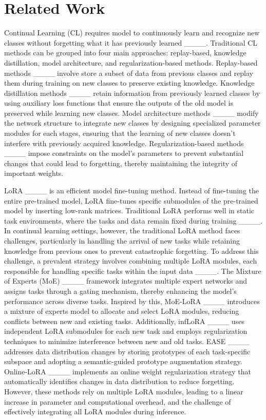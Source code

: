 \section{Related Work}

Continual Learning (CL) requires model to continuously learn and recognize new classes without forgetting what it has previously learned ____. Traditional CL methods can be grouped into four main approaches: replay-based, knowledge distillation, model architecture, and regularization-based methods. Replay-based methods ____ involve store a subset of data from previous classes and replay them during training on new classes to preserve existing knowledge. Knowledge distillation methods ____ retain information from previously learned classes by using auxiliary loss functions that ensure the outputs of the old model is preserved while learning new classes. Model architecture methods ____ modify the network structure to integrate new classes by designing specialized parameter modules for each stages, ensuring that the learning of new classes doesn't interfere with previously acquired knowledge. Regularization-based methods ____ impose constraints on the model’s parameters to prevent substantial changes that could lead to forgetting, thereby maintaining the integrity of important weights.


LoRA ____ is an efficient model fine-tuning method. Instead of fine-tuning the entire pre-trained model, LoRA fine-tunes specific submodules of the pre-trained model by inserting low-rank matrices. Traditional LoRA performs well in static task environments, where the tasks and data remain fixed during training ____. In continual learning settings, however, the traditional LoRA method faces challenges, particularly in handling the arrival of new tasks while retaining knowledge from previous ones to prevent catastrophic forgetting.
To address this challenge, a prevalent strategy involves combining multiple LoRA modules, each responsible for handling specific tasks within the input data ____. The Mixture of Experts (MoE) ____ framework integrates multiple expert networks and assigns tasks through a gating mechanism, thereby enhancing the model's performance across diverse tasks. Inspired by this, MoE-LoRA ____ introduces a mixture of experts model to allocate and select LoRA modules, reducing conflicts between new and existing tasks. Additionally, infLoRA ____ uses independent LoRA submodules for each new task and employs regularization techniques to minimize interference between new and old tasks. EASE ____ addresses data distribution changes by storing prototypes of each task-specific subspace and adopting a semantic-guided prototype augmentation strategy. Online-LoRA ____ implements an online weight regularization strategy that automatically identifies changes in data distribution to reduce forgetting.
However, these methods rely on multiple LoRA modules, leading to a linear increase in parameter and computational overhead, and the challenge of effectively integrating all LoRA modules during inference.

